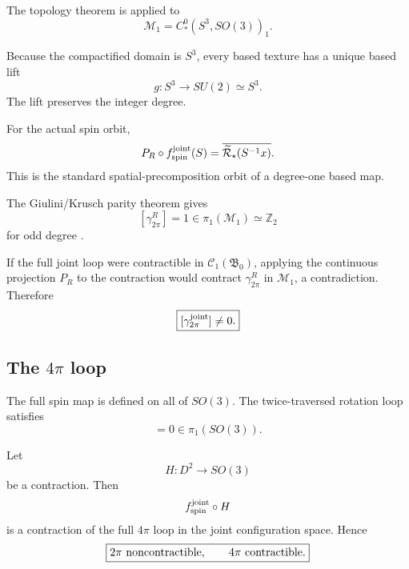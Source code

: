 \documentclass[11pt]{article}
\begin{document}
The topology theorem is applied to
\begin{equation}
\mathcal M_1
=
C_*^0(S^3,SO(3))_1.
\end{equation}

Because the compactified domain is \(S^3\), every based texture has a unique based lift
\begin{equation}
g:S^3\to SU(2)\simeq S^3.
\end{equation}
The lift preserves the integer degree.

For the actual spin orbit,
\begin{equation}
P_R\circ
f_{\rm spin}^{\rm joint}(S)
=
\overline{\widetilde{\mathcal R}_\star(S^{-1}x)}.
\end{equation}
This is the standard spatial-precomposition orbit of a degree-one based map.

The Giulini/Krusch parity theorem gives
\begin{equation}
\boxed{
[\gamma_{2\pi}^{R}]
=
1
\in
\pi_1(\mathcal M_1)
\simeq
\mathbb Z_2
}
\end{equation}
for odd degree \cite{Giulini1993,Krusch2003,Krusch2006}.

If the full joint loop were contractible in \(\mathscr C_1(\mathfrak B_0)\), applying the continuous projection \(P_R\) to the contraction would contract \(\gamma_{2\pi}^{R}\) in \(\mathcal M_1\), a contradiction. Therefore
\begin{equation}
\boxed{
[\gamma_{2\pi}^{\rm joint}]
\neq0.
}
\end{equation}

\subsection{The \texorpdfstring{\(4\pi\)}{4pi} loop}

The full spin map is defined on all of \(SO(3)\). The twice-traversed rotation loop satisfies
\begin{equation}
[4\pi]
=
0
\in
\pi_1(SO(3)).
\end{equation}

Let
\begin{equation}
H:D^2\to SO(3)
\end{equation}
be a contraction. Then
\begin{equation}
f_{\rm spin}^{\rm joint}\circ H
\end{equation}
is a contraction of the full \(4\pi\) loop in the joint configuration space. Hence
\begin{equation}
\boxed{
2\pi\ {\rm noncontractible},
\qquad
4\pi\ {\rm contractible}.
}
\end{equation}
\end{document}
